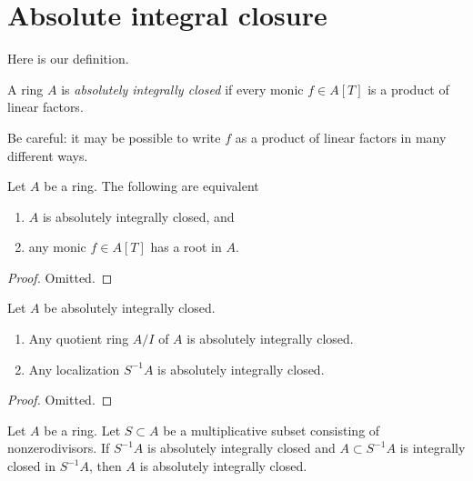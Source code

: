 \section{Absolute integral closure}
\label{section-absolute-integral-closure}

\noindent
Here is our definition.

\begin{definition}
\label{definition-absolutely-integrally-closed}
A ring $A$ is {\it absolutely integrally closed} if every
monic $f \in A[T]$ is a product of linear factors.
\end{definition}

\noindent
Be careful: it may be possible to write $f$ as a product of
linear factors in many different ways.

\begin{lemma}
\label{lemma-absolutely-integrally-closed}
Let $A$ be a ring. The following are equivalent
\begin{enumerate}
\item $A$ is absolutely integrally closed, and
\item any monic $f \in A[T]$ has a root in $A$.
\end{enumerate}
\end{lemma}

\begin{proof}
Omitted.
\end{proof}

\begin{lemma}
\label{lemma-absolutely-integrally-closed-quotient-localization}
Let $A$ be absolutely integrally closed.
\begin{enumerate}
\item Any quotient ring $A/I$ of $A$ is absolutely integrally closed.
\item Any localization $S^{-1}A$ is absolutely integrally closed.
\end{enumerate}
\end{lemma}

\begin{proof}
Omitted.
\end{proof}

\begin{lemma}
\label{lemma-integrally-closed-in-absolutely-integrally-closed}
Let $A$ be a ring. Let $S \subset A$ be a multiplicative subset
consisting of nonzerodivisors.
If $S^{-1}A$ is absolutely integrally closed and $A \subset S^{-1}A$
is integrally closed in $S^{-1}A$, then $A$ is absolutely integrally closed.
\end{lemma}

